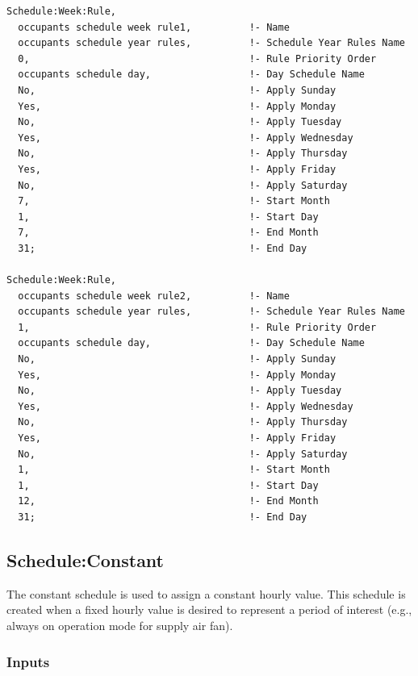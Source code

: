 \begin{lstlisting}
Schedule:Week:Rule,
  occupants schedule week rule1,          !- Name
  occupants schedule year rules,          !- Schedule Year Rules Name
  0,                                      !- Rule Priority Order
  occupants schedule day,                 !- Day Schedule Name
  No,                                     !- Apply Sunday
  Yes,                                    !- Apply Monday
  No,                                     !- Apply Tuesday
  Yes,                                    !- Apply Wednesday
  No,                                     !- Apply Thursday
  Yes,                                    !- Apply Friday
  No,                                     !- Apply Saturday
  7,                                      !- Start Month
  1,                                      !- Start Day
  7,                                      !- End Month
  31;                                     !- End Day

Schedule:Week:Rule,
  occupants schedule week rule2,          !- Name
  occupants schedule year rules,          !- Schedule Year Rules Name
  1,                                      !- Rule Priority Order
  occupants schedule day,                 !- Day Schedule Name
  No,                                     !- Apply Sunday
  Yes,                                    !- Apply Monday
  No,                                     !- Apply Tuesday
  Yes,                                    !- Apply Wednesday
  No,                                     !- Apply Thursday
  Yes,                                    !- Apply Friday
  No,                                     !- Apply Saturday
  1,                                      !- Start Month
  1,                                      !- Start Day
  12,                                     !- End Month
  31;                                     !- End Day
\end{lstlisting}

\subsection{Schedule:Constant}\label{scheduleconstant}

The constant schedule is used to assign a constant hourly value. This schedule is created when a fixed hourly value is desired to represent a period of interest (e.g., always on operation mode for supply air fan).

\subsubsection{Inputs}\label{inputs-8-021}

